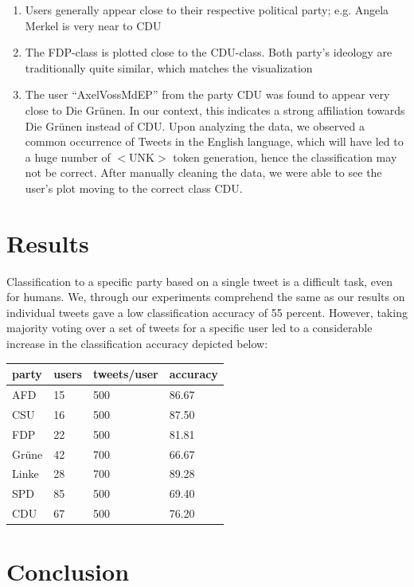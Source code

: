 \documentclass[10pt, oneside]{article}
\begin{document}
\begin{multicols}{2}
\begin{enumerate}
	\item Users generally appear close to their respective political party; e.g. Angela Merkel is very near to CDU
	\item The FDP-class is plotted close to the CDU-class. Both party's ideology are traditionally quite similar, which matches the visualization
	\item The user ``AxelVossMdEP'' from the party CDU was found to appear very close to Die Grünen. In our context, this indicates a strong affiliation towards Die Grünen instead of CDU. Upon analyzing the data, we observed a common occurrence  of Tweets in the English language, which will have led to a huge number of $<$UNK$>$ token generation, hence the classification may not be correct. After manually cleaning the data, we were able to see the user's plot moving to the correct class CDU.
\end{enumerate}

\section{Results}
Classification to a specific party based on a single tweet is a difficult task, even for humans. We, through our experiments comprehend the same as our results on individual tweets gave a low classification accuracy of 55 percent.
However, taking majority voting over a set of tweets for a specific user led to a considerable increase in the classification accuracy depicted below:
\begin{center}
	\begin{tabular}{|l|l|l|l|}
	\hline
	\textbf{party} & \textbf{users} & \textbf{tweets/user} & \textbf{accuracy} \\ \hline
	AFD & 15 & 500 & 86.67 \\
	CSU & 16 & 500 & 87.50 \\
	FDP & 22 & 500 & 81.81 \\
	Grüne & 42 & 700 & 66.67 \\
	Linke & 28 & 700 & 89.28 \\
	SPD & 85 & 500 & 69.40 \\
	CDU & 67 & 500 & 76.20 \\
	\hline
	\end{tabular}
\end{center}


\section{Conclusion}


\end{multicols}
\end{document}
